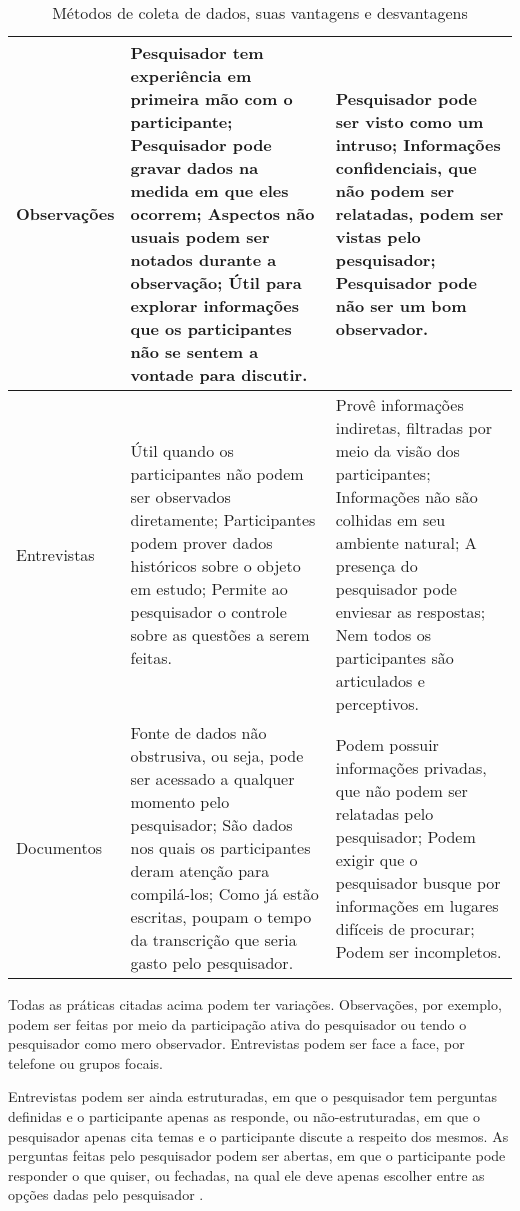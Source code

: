 \begin{table}
	\begin{tabular}{ | p{3cm} | p{6cm} | p{6cm} | }
		\hline
		Observações &
		  Pesquisador tem experiência em primeira mão com o participante;
		  Pesquisador pode gravar dados na medida em que eles ocorrem;
		  Aspectos não usuais podem ser notados durante a observação;
		  Útil para explorar informações que os participantes não se sentem a
		  vontade para discutir.
		&
		  Pesquisador pode ser visto como um intruso;
		  Informações confidenciais, que não podem ser relatadas, podem ser
		  vistas pelo pesquisador;
		  Pesquisador pode não ser um bom observador.
		\\
		\hline
		Entrevistas &
		  Útil quando os participantes não podem ser observados diretamente;
		  Participantes podem prover dados históricos sobre o objeto em estudo;
		  Permite ao pesquisador o controle sobre as questões a serem feitas.
		&
		  Provê informações indiretas, filtradas por meio da visão dos
		  participantes;
		  Informações não são colhidas em seu ambiente natural;
		  A presença do pesquisador pode enviesar as respostas;
		  Nem todos os participantes são articulados e perceptivos.
		\\
		\hline
		Documentos &
		  Fonte de dados não obstrusiva, ou seja, pode ser acessado a qualquer
		  momento pelo pesquisador;
		  São dados nos quais os participantes deram atenção para compilá-los;
		  Como já estão escritas, poupam o tempo da transcrição que
		  seria gasto pelo pesquisador.
		&
		  Podem possuir informações privadas, que não podem ser relatadas pelo
		  pesquisador;
		  Podem exigir que o pesquisador busque por informações em lugares
		  difíceis de procurar;
		  Podem ser incompletos.
		\\			
		\hline
	\end{tabular}
	\caption{Métodos de coleta de dados, suas vantagens e desvantagens}
	\label{tab:coleta-de-dados}
\end{table}

Todas as práticas citadas acima podem ter variações. Observações, por exemplo,
podem ser feitas por meio da participação ativa do pesquisador ou tendo o
pesquisador como mero observador. Entrevistas podem ser face a face, por
telefone ou grupos focais. 

Entrevistas podem ser ainda estruturadas, em que o
pesquisador tem perguntas definidas e o participante apenas as responde, ou
não-estruturadas, em que o pesquisador apenas cita temas e o participante discute
a respeito dos mesmos. As perguntas feitas pelo pesquisador podem ser abertas,
em que o participante pode responder o que quiser, ou fechadas, na qual ele
deve apenas escolher entre as opções dadas pelo pesquisador \cite{seaman}.

